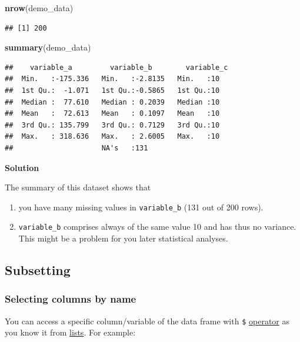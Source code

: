 \documentclass[
]{scrartcl}
\newenvironment{Shaded}{\begin{snugshade}}{\end{snugshade}}
\newcommand{\FunctionTok}[1]{\textcolor[rgb]{0.13,0.29,0.53}{\textbf{#1}}}
\newcommand{\NormalTok}[1]{#1}
\providecommand{\tightlist}{%
  \setlength{\itemsep}{0pt}\setlength{\parskip}{0pt}}
\newenvironment{webexsolution}[1]
    {\par\tiny\textbf{#1}}
    {\par}
\newcommand{\webexhide}[1]{\begin{webexsolution}{#1}}
\newcommand{\webexunhide}{\end{webexsolution}}
\begin{document}
\begin{Shaded}
\begin{Highlighting}[]
\FunctionTok{nrow}\NormalTok{(demo\_data)}
\end{Highlighting}
\end{Shaded}

\begin{verbatim}
## [1] 200
\end{verbatim}

\begin{Shaded}
\begin{Highlighting}[]
\FunctionTok{summary}\NormalTok{(demo\_data)}
\end{Highlighting}
\end{Shaded}

\begin{verbatim}
##    variable_a         variable_b        variable_c
##  Min.   :-175.336   Min.   :-2.8135   Min.   :10  
##  1st Qu.:  -1.071   1st Qu.:-0.5865   1st Qu.:10  
##  Median :  77.610   Median : 0.2039   Median :10  
##  Mean   :  72.613   Mean   : 0.1097   Mean   :10  
##  3rd Qu.: 135.799   3rd Qu.: 0.7129   3rd Qu.:10  
##  Max.   : 318.636   Max.   : 2.6005   Max.   :10  
##                     NA's   :131
\end{verbatim}

\webexhide{Solution}

The summary of this dataset shows that

\begin{enumerate}
\def\labelenumi{\arabic{enumi}.}
\tightlist
\item
  you have many missing values in \texttt{variable\_b} (131 out of 200 rows).
\item
  \texttt{variable\_b} comprises always of the same value 10 and has thus no variance. This might be a problem for you later statistical analyses.
\end{enumerate}

\webexunhide

\subsection{Subsetting}\label{nolabel}

\subsubsection{Selecting columns by name}\label{selectbyname}

You can access a specific column/variable of the data frame with \texttt{\$} \hyperref[listsdollar]{operator} as you know it from \hyperref[lists]{lists}. For example:
\end{document}
